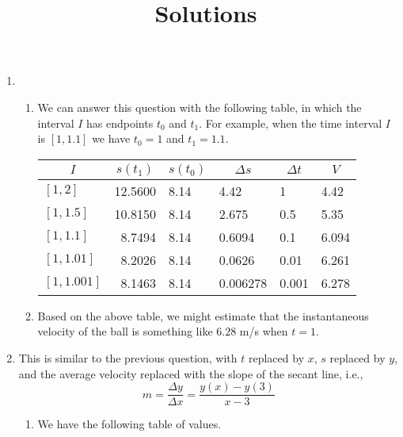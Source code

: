 \documentclass{article}
\title{\commonPSTitleZeroOneFour\ Solutions}
\author{\commonAuthor}
\date{\commonDateZeroOneFour}
\begin{document}
\maketitle
\begin{enumerate}
\item %
  \begin{enumerate}
  \item We can answer this question with the following table, in which
    the interval $I$ has endpoints $t_0$ and $t_1$.  For example,
    when the time interval $I$ is $[1,1.1]$ we have $t_0=1$ and $t_1=1.1$.
    \begin{center}
      \begin{tabular}{|l|r|l|l|l|l|}
        \hline
        \multicolumn{1}{|c|}{$I$}        
	           & \multicolumn{1}{|c|}{$s(t_1)$}
		              & \multicolumn{1}{|c|}{$s(t_0)$} 
			                 & \multicolumn{1}{|c|}{$\Delta s$} 
					       & \multicolumn{1}{c}{$\Delta t$}
					          & \multicolumn{1}{|c|}{$V$} \\
	\hline\hline
	$[1,2]$    & 12.5600  & 8.14     & 4.42       & 1          & 4.42  \\
	\hline
	$[1,1.5]$  & 10.8150  & 8.14     & 2.675      & 0.5        & 5.35  \\
	\hline
	$[1,1.1]$  &  8.7494  & 8.14     & 0.6094     & 0.1        & 6.094 \\
	\hline
	$[1,1.01]$ &  8.2026  & 8.14     & 0.0626     & 0.01       & 6.261 \\
	\hline
	$[1,1.001]$ & 8.1463  & 8.14     & 0.006278   & 0.001      & 6.278 \\
	\hline
      \end{tabular}
    \end{center}
  \item Based on the above table, we might estimate that the instantaneous
    velocity of the ball is something like $6.28$ m/s when $t=1$.
  \end{enumerate}
\item This is similar to the previous question, with $t$ replaced by $x$,
  $s$ replaced by $y$, and the average velocity replaced with the slope
  of the secant line, i.e.,
  \begin{equation*}
    m  = \frac{\Delta y}{\Delta x} = \frac{y(x)-y(3)}{x-3}
  \end{equation*}
  \begin{enumerate}
  \item We have the following table of values.
    \begin{center}

\end{center}
\end{enumerate}
\end{enumerate}
\end{document}
